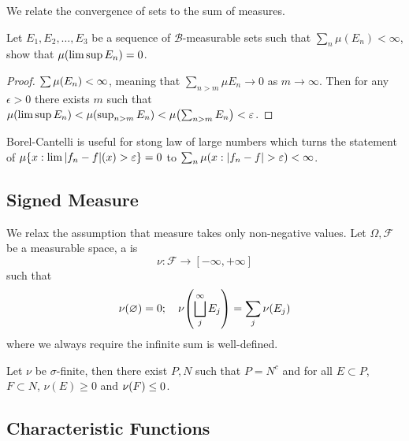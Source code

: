 We relate the convergence of sets to the sum  of measures. 
\begin{thm}
    Let \(E_{1}, E_{2},\dots,E_{3}\) be a sequence of \(\mathcal{B}\)-measurable sets such that \(\sum_{n} \mu(E_{n}) < \infty\), show that \(\mu\pqty{\limsup E_{n}} = 0\). 
\end{thm}
\begin{proof}
    \(\sum \mu \pqty{E_{n}} < \infty\), meaning that \(\sum_{n > m} \mu E_{n} \to 0\) as \(m\to \infty\). Then for any \(\epsilon>0\) there exists \(m\) such that \(\mu\pqty{\limsup E_{n}} < \mu \pqty{\sup_{n>m} E_{n}} < \mu \pqty{\sum_{n>m} E_{n}} < \epsilon\). 
\end{proof}
\begin{remark}
    Borel-Cantelli is useful for stong law of large numbers which turns the statement of \(\mu\Bqty{x: \lim \abs{f_{n} - f} (x) > \epsilon} = 0\) to \(\sum_{n} \mu\pqty{x: \abs{f_{n} - f} > \epsilon} < \infty\). 
\end{remark}

\subsection{Signed Measure}


We relax the assumption that measure takes only non-negative values. Let \(\Omega, \mathcal{F}\) be a measurable space, a  is \begin{equation*}
    \nu: \mathcal{F} \to [-\infty,+ \infty]
\end{equation*}
such that 
\begin{equation*}
    \nu\pqty{\emptyset} = 0; \quad \nu\pqty{\bigsqcup_{j}^{\infty} E_{j}} = \sum_{j} \nu\pqty{E_{j}} 
\end{equation*}
where we always require the infinite sum is well-defined. 

\begin{thm}
    Let \(\nu\) be \(\sigma\)-finite, then there exist \(P,N\) such that \(P = N^{c}\) and for all \(E\subset P\), \(F\subset N\), \(\nu(E) \geq 0\) and \(\nu \pqty{F} \leq 0\). 
\end{thm}


\subsection{Characteristic Functions}

